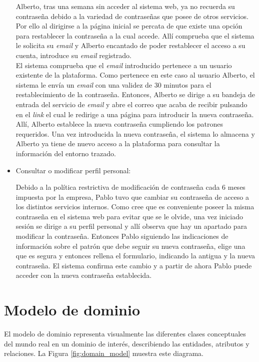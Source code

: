 \documentclass[12pt,a4paper, twoside]{report}
\begin{document}
\begin{itemize}
		Alberto, tras una semana sin acceder al sistema web, ya no recuerda su contraseña debido a la variedad de contraseñas que posee de otros servicios. Por ello al dirigirse a la página inicial se percata de que existe una opción para restablecer la contraseña a la cual accede. Allí comprueba que el sistema le solicita su \textit{email} y Alberto encantado de poder restablecer el acceso a su cuenta, introduce su \textit{email} registrado. \\
		
		El sistema comprueba que el \textit{email} introducido pertenece a un usuario existente de la plataforma. Como pertenece en este caso al usuario Alberto, el sistema le envía un \textit{email} con una validez de 30 minutos para el restablecimiento de la contraseña. Entonces, Alberto se dirige a su bandeja de entrada del servicio de \textit{email} y abre el correo que acaba de recibir pulsando en el \textit{link} el cual le redirige a una página para introducir la nueva contraseña. Allí, Alberto establece la nueva contraseña cumpliendo los patrones requeridos. Una vez introducida la nueva contraseña, el sistema lo almacena y Alberto ya tiene de nuevo acceso a la plataforma para consultar la información del entorno trazado.
				
		\item Consultar o modificar perfil personal:
		
		Debido a la política restrictiva de modificación de contraseña cada 6 meses impuesta por la empresa, Pablo tuvo que cambiar su contraseña de acceso a los distintos servicios internos. Como cree que es conveniente poseer la misma contraseña en el sistema web para evitar que se le olvide, una vez iniciado sesión se dirige a su perfil personal y allí observa que hay un apartado para modificar la contraseña. Entonces Pablo siguiendo las indicaciones de información sobre el patrón que debe seguir su nueva contraseña, elige una que es segura y entonces rellena el formulario, indicando la antigua y la nueva contraseña. El sistema confirma este cambio y a partir de ahora Pablo puede acceder con la nueva contraseña establecida.
				
	\end{itemize}
	
	\section{Modelo de dominio}
		
	El modelo de dominio representa visualmente las diferentes clases conceptuales del mundo real en un dominio de interés, describiendo las entidades, atributos y relaciones. La Figura \ref{fig:domain_model} muestra este diagrama.
	
\end{document}
